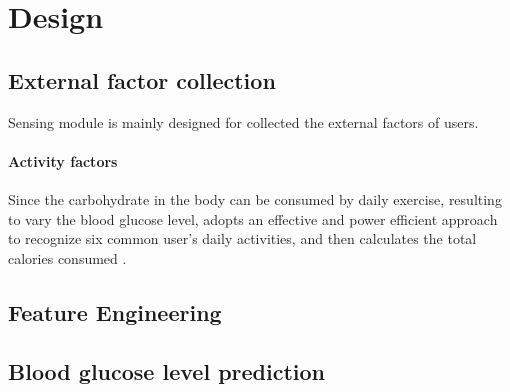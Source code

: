 
\section{Design}
\label{sec:design}

\subsection{External factor collection}
Sensing module is mainly designed for collected the external factors of users.

\paragraph{Activity factors}
Since the carbohydrate in the body can be consumed by daily exercise, resulting to vary the blood glucose level, \sysname adopts an effective and power efficient approach \cite{bib:kwapisz2011activity} to recognize six common user's daily activities, and then calculates the total calories consumed . 




\subsection{Feature Engineering}


\subsection{Blood glucose level prediction}
